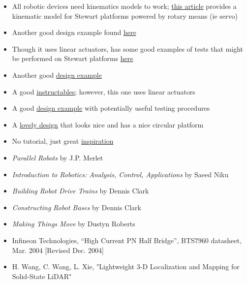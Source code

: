 \documentclass[a4paper, 10pt]{article}
\begin{document}
\begin{itemize}
		\item All robotic devices need kinematics models to work; \href{https://www.xarg.org/paper/inverse-kinematics-of-a-stewart-platform/}{this article} provides a kinematic model for Stewart platforms powered by rotary means (ie servo)
		
		\item Another good design example found \href{https://iopscience.iop.org/article/10.1088/1757-899X/563/5/052059/pdf}{here}
		
		\item Though it uses linear actuators, has some good examples of tests that might be performed on Stewart platforms \href{https://www.ncbi.nlm.nih.gov/pmc/articles/PMC6513003/}{here}
		
		\item Another good \href{https://core.ac.uk/download/pdf/322824733.pdf}{design example}
		
		\item A good \href{https://www.instructables.com/Six-Axis-Platform-Using-Linear-Actuators-Stewart-P/}{instructables}; however, this one uses linear actuators
		
		\item A good \href{https://www.ohio.edu/mechanical-faculty/williams/html/PDF/IndRob02.pdf}{design example} with potentially useful testing procedures
		
		\item A \href{https://www.mdpi.com/2218-6581/7/2/30}{lovely design} that looks nice and has a nice circular platform
		
		\item No tutorial, just great \href{https://www.youtube.com/watch?v=kscvCQTtVvw&t=0s}{inspiration}
		
		\item \textit{Parallel Robots} by J.P. Merlet
		
		\item \textit{Introduction to Robotics: Analysis, Control, Applications} by Saeed Niku
		\item \textit{Building Robot Drive Trains} by Dennis Clark
		
		\item \textit{Constructing Robot Bases} by Dennis Clark
		
		\item \textit{Making Things Move} by Dustyn Roberts		
		
		\item Infineon Technologies, ``High Current PN Half Bridge'', BTS7960 datasheet, Mar. 2004 [Revised Dec. 2004]
		
		\item H. Wang, C. Wang, L. Xie, "Lightweight 3-D Localization and Mapping for Solid-State LiDAR"
	\end{itemize}	
\end{document}
